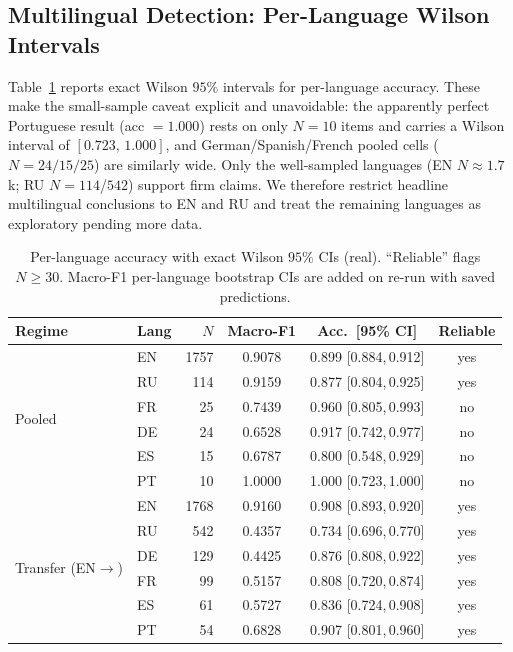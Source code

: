 \documentclass[11pt,a4paper]{article}
\begin{document}
\subsection{Multilingual Detection: Per-Language Wilson Intervals}
Table~\ref{tab:stats-ml} reports exact Wilson $95\%$ intervals for per-language accuracy.
These make the small-sample caveat explicit and unavoidable: the apparently perfect
Portuguese result (acc $=1.000$) rests on only $N=10$ items and carries a Wilson interval
of $[0.723,\,1.000]$, and German/Spanish/French pooled cells ($N=24/15/25$) are similarly
wide. Only the well-sampled languages (EN $N\!\approx\!1.7$k; RU $N=114$/$542$) support
firm claims. We therefore restrict headline multilingual conclusions to EN and RU and
treat the remaining languages as exploratory pending more data.

\begin{table}[h]
\centering
\caption{Per-language accuracy with exact Wilson $95\%$ CIs (real). ``Reliable''
flags $N\geq 30$. Macro-F1 per-language bootstrap CIs are added on re-run with saved
predictions.}
\label{tab:stats-ml}
\small
\begin{tabular}{@{}llrccc@{}}
\toprule
\textbf{Regime} & \textbf{Lang} & \textbf{$N$} & \textbf{Macro-F1} & \textbf{Acc.\ [95\% CI]} & \textbf{Reliable} \\
\midrule
\multirow{6}{*}{Pooled}
 & EN & 1757 & 0.9078 & 0.899 [0.884,\,0.912] & yes \\
 & RU &  114 & 0.9159 & 0.877 [0.804,\,0.925] & yes \\
 & FR &   25 & 0.7439 & 0.960 [0.805,\,0.993] & no \\
 & DE &   24 & 0.6528 & 0.917 [0.742,\,0.977] & no \\
 & ES &   15 & 0.6787 & 0.800 [0.548,\,0.929] & no \\
 & PT &   10 & 1.0000 & 1.000 [0.723,\,1.000] & no \\
\midrule
\multirow{6}{*}{Transfer (EN$\rightarrow$)}
 & EN & 1768 & 0.9160 & 0.908 [0.893,\,0.920] & yes \\
 & RU &  542 & 0.4357 & 0.734 [0.696,\,0.770] & yes \\
 & DE &  129 & 0.4425 & 0.876 [0.808,\,0.922] & yes \\
 & FR &   99 & 0.5157 & 0.808 [0.720,\,0.874] & yes \\
 & ES &   61 & 0.5727 & 0.836 [0.724,\,0.908] & yes \\
 & PT &   54 & 0.6828 & 0.907 [0.801,\,0.960] & yes \\
\bottomrule
\end{tabular}
\end{table}
\end{document}
